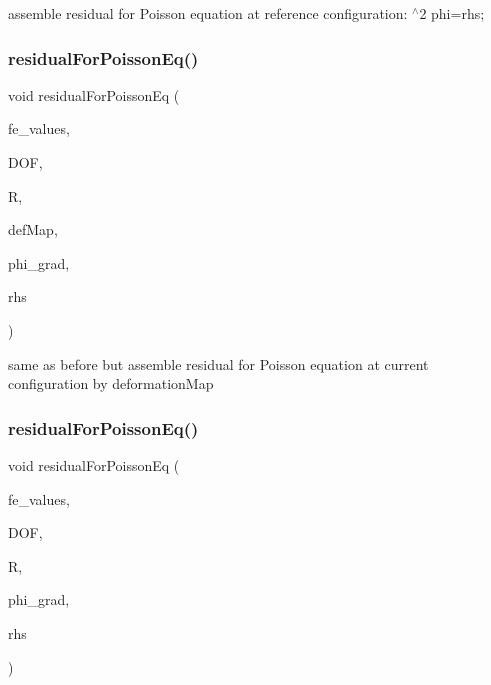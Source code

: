 assemble residual for Poisson equation at reference configuration\+: $^\wedge$2 phi=rhs; \mbox{\label{class_residual_ad457db9bcfe7ff4d134642440cd1c4e6}} 
\subsubsection{\texorpdfstring{residual\+For\+Poisson\+Eq()}{residualForPoissonEq()}\hspace{0.1cm}{\footnotesize\ttfamily [2/4]}}
{\footnotesize\ttfamily void residual\+For\+Poisson\+Eq (\begin{DoxyParamCaption}\item[{const F\+E\+Values$<$ dim $>$ \&}]{fe\+\_\+values,  }\item[{unsigned int}]{D\+OF,  }\item[{dealii\+::\+Table$<$ 1, T $>$ \&}]{R,  }\item[{\mbox{\hyperlink{structdeformation_map}{deformation\+Map}}$<$ T, dim $>$ \&}]{def\+Map,  }\item[{dealii\+::\+Table$<$ 2, T $>$ \&}]{phi\+\_\+grad,  }\item[{dealii\+::\+Table$<$ 1, T $>$ \&}]{rhs }\end{DoxyParamCaption})}

same as before but assemble residual for Poisson equation at current configuration by deformation\+Map \mbox{\label{class_residual_ad1d5fc375c6f93d9aad89fc1cf9fd25f}} 
\subsubsection{\texorpdfstring{residual\+For\+Poisson\+Eq()}{residualForPoissonEq()}\hspace{0.1cm}{\footnotesize\ttfamily [3/4]}}
{\footnotesize\ttfamily void residual\+For\+Poisson\+Eq (\begin{DoxyParamCaption}\item[{const F\+E\+Values$<$ dim $>$ \&}]{fe\+\_\+values,  }\item[{unsigned int}]{D\+OF,  }\item[{dealii\+::\+Table$<$ 1, T $>$ \&}]{R,  }\item[{dealii\+::\+Table$<$ 3, T $>$ \&}]{phi\+\_\+grad,  }\item[{dealii\+::\+Table$<$ 2, T $>$ \&}]{rhs }\end{DoxyParamCaption})}

